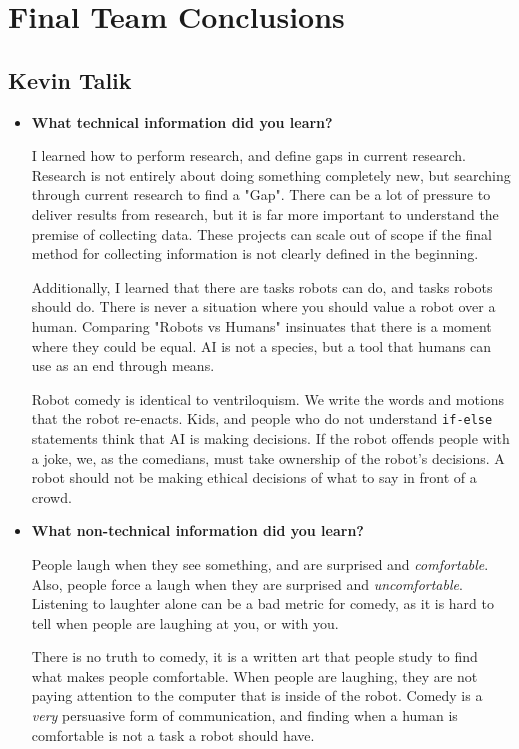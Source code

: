 
\section{Final Team Conclusions}
\subsection{Kevin Talik}

\begin{itemize}
\item{\textbf{What technical information did you learn?}}

    I learned how to perform research, and define gaps in current research.
    Research is not entirely about doing something completely new, but searching through current research to find a "Gap".
    There can be a lot of pressure to deliver results from research, but it is far more important to understand the premise of collecting data.
    These projects can scale out of scope if the final method for collecting information is not clearly defined in the beginning.

    Additionally, I learned that there are tasks robots can do, and tasks robots should do.
    There is never a situation where you should value a robot over a human.
    Comparing "Robots vs Humans" insinuates that there is a moment where they could be equal.
    AI is not a species, but a tool that humans can use as an end through means.

    Robot comedy is identical to ventriloquism.
    We write the words and motions that the robot re-enacts.
    Kids, and people who do not understand \texttt{if-else} statements think that AI is making decisions.
    If the robot offends people with a joke, we, as the comedians, must take ownership of the robot's decisions.
    A robot should not be making ethical decisions of what to say in front of a crowd.


\item{\textbf{What non-technical information did you learn?}}


    People laugh when they see something, and are surprised and \textit{comfortable}.
    Also, people force a laugh when they are surprised and \textit{uncomfortable}.
    Listening to laughter alone can be a bad metric for comedy, as it is hard to tell when people are laughing at you, or with you.

    There is no truth to comedy, it is a written art that people study to find what makes people comfortable.
    When people are laughing, they are not paying attention to the computer that is inside of the robot.
    Comedy is a \textit{very} persuasive form of communication, and finding when a human is comfortable is not a task a robot should have.



\end{itemize}
